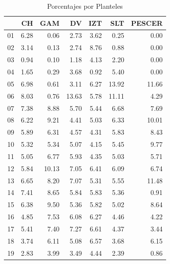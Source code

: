 \documentclass[12pt]{article}
\begin{document}
\begin{table}[ht]
\centering
\caption{Porcentajes por Planteles} 
\begin{tabular}{r|rrrrrr}
  \hline
 & CH & GAM & DV & IZT & SLT & PESCER \\ 
  \hline
01 & 6.28 & 0.06 & 2.73 & 3.62 & 0.25 & 0.00 \\ 
  02 & 3.14 & 0.13 & 2.74 & 8.76 & 0.88 & 0.00 \\ 
  03 & 0.94 & 0.10 & 1.18 & 4.13 & 2.20 & 0.00 \\ 
  04 & 1.65 & 0.29 & 3.68 & 0.92 & 5.40 & 0.00 \\ 
  05 & 6.98 & 0.61 & 3.11 & 6.27 & 13.92 & 11.66 \\ 
  06 & 8.03 & 0.76 & 13.63 & 5.78 & 11.11 & 4.29 \\ 
  07 & 7.38 & 8.88 & 5.70 & 5.44 & 6.68 & 7.69 \\ 
  08 & 6.22 & 9.21 & 4.41 & 5.03 & 6.33 & 10.01 \\ 
  09 & 5.89 & 6.31 & 4.57 & 4.31 & 5.83 & 8.43 \\ 
  10 & 5.32 & 5.34 & 5.07 & 4.15 & 5.45 & 9.77 \\ 
  11 & 5.05 & 6.77 & 5.93 & 4.35 & 5.03 & 5.71 \\ 
  12 & 5.84 & 10.13 & 7.05 & 6.41 & 6.09 & 6.74 \\ 
  13 & 6.65 & 8.20 & 7.07 & 5.31 & 5.55 & 11.48 \\ 
  14 & 7.41 & 8.65 & 5.84 & 5.83 & 5.36 & 0.91 \\ 
  15 & 6.38 & 9.50 & 5.36 & 5.82 & 5.02 & 8.64 \\ 
  16 & 4.85 & 7.53 & 6.08 & 6.27 & 4.46 & 4.22 \\ 
  17 & 5.41 & 7.40 & 7.27 & 6.61 & 4.37 & 3.44 \\ 
  18 & 3.74 & 6.11 & 5.08 & 6.57 & 3.68 & 6.15 \\ 
  19 & 2.83 & 3.99 & 3.49 & 4.44 & 2.39 & 0.86 \\ 
   \hline
\end{tabular}
\end{table}
\end{document}
